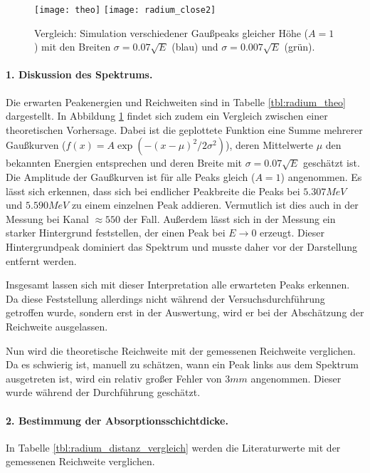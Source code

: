 \documentclass{../Misc/MontavonLaTeX/Montavon}
\newcommand{\halfwidth}{0.48\textwidth}
\begin{document}
\begin{figure}[htbp]
\centering
\texttt{[image: theo]}
\texttt{[image: radium\_close2]}
\caption{Vergleich: Simulation verschiedener Gaußpeaks gleicher Höhe ($A = 1$) mit den Breiten $\sigma = 0.07 \sqrt{E}$ (blau) und $\sigma = 0.007 \sqrt{E}$ (grün).}
\label{fig:radium_theo}
\end{figure}

\paragraph{1. Diskussion des Spektrums.} 
Die erwarten Peakenergien und Reichweiten sind in Tabelle \ref{tbl:radium_theo} dargestellt. In Abbildung \ref{fig:radium_theo} findet sich zudem ein Vergleich zwischen einer theoretischen Vorhersage. Dabei ist die geplottete Funktion eine Summe mehrerer Gaußkurven ($f(x) = A \exp\left(-(x-\mu)^2 / 2 \sigma^2 \right)$), deren Mittelwerte $\mu$ den bekannten Energien entsprechen und deren Breite mit $\sigma = 0.07 \sqrt{E}$ geschätzt ist. Die Amplitude der Gaußkurven ist für alle Peaks gleich ($A = 1$) angenommen. Es lässt sich erkennen, dass sich bei endlicher Peakbreite die Peaks bei $5.307 \unit{MeV}$ und $5.590 \unit{MeV}$  zu einem einzelnen Peak addieren. Vermutlich ist dies auch in der Messung bei Kanal $\approx 550$ der Fall. 
Außerdem lässt sich in der Messung ein starker Hintergrund feststellen, der einen Peak bei $E \rightarrow 0$ erzeugt. Dieser Hintergrundpeak dominiert das Spektrum und musste daher vor der Darstellung entfernt werden.

Insgesamt lassen sich mit dieser Interpretation alle erwarteten Peaks erkennen. Da diese Feststellung allerdings nicht während der Versuchsdurchführung getroffen wurde, sondern erst in der Auswertung, wird er bei der Abschätzung der Reichweite ausgelassen.

Nun wird die theoretische Reichweite mit der gemessenen Reichweite verglichen. Da es schwierig ist, manuell zu schätzen, wann ein Peak links aus dem Spektrum ausgetreten ist, wird ein relativ großer Fehler von $3 \unit{mm}$ angenommen. Dieser wurde während der Durchführung geschätzt.

\paragraph{2. Bestimmung der Absorptionsschichtdicke.} 
In Tabelle \ref{tbl:radium_distanz_vergleich} werden die Literaturwerte mit der gemessenen Reichweite verglichen. 
\end{document}
